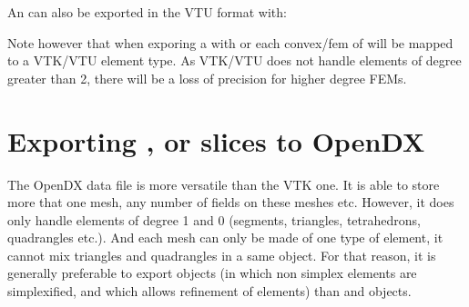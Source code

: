 \documentclass[a4paper,11pt,english]{sphinxmanual}
\begin{document}
An   can also be exported in the VTU format with:

\begin{sphinxVerbatim}[commandchars=\\\{\}]
 
 
   
   
\end{sphinxVerbatim}

Note however that when exporing a  with  or 
each convex/fem of  will be mapped to a VTK/VTU element type. As
VTK/VTU does not handle elements of degree greater than 2, there will be a
loss of precision for higher degree FEMs.


\section{Exporting ,  or slices to OpenDX}
\label{\detokenize{userdoc/export:exporting-m-mf-or-slices-to-opendx}}
The OpenDX data file is more versatile than the VTK one. It is able to store more
that one mesh, any number of fields on these meshes etc. However, it does only
handle elements of degree 1 and 0 (segments, triangles, tetrahedrons, quadrangles
etc.). And each mesh can only be made of one type of element, it cannot mix
triangles and quadrangles in a same object. For that reason, it is generally
preferable to export  objects (in which non simplex elements are
simplexified, and which allows refinement of elements) than  and 
objects.
\end{document}
